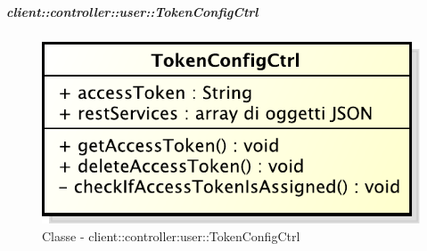 		\subparagraph{client::controller::user::TokenConfigCtrl} %
		\label{subp:client_controller_user_tokenconfigctrl}
			\begin{figure}[htbp]
				\centering
				\centerline{\includegraphics[scale=0.7]{./images/client/classes/controller/token_config_ctrl.pdf}}
				\caption{Classe - client::controller:user::TokenConfigCtrl}
			\end{figure}
